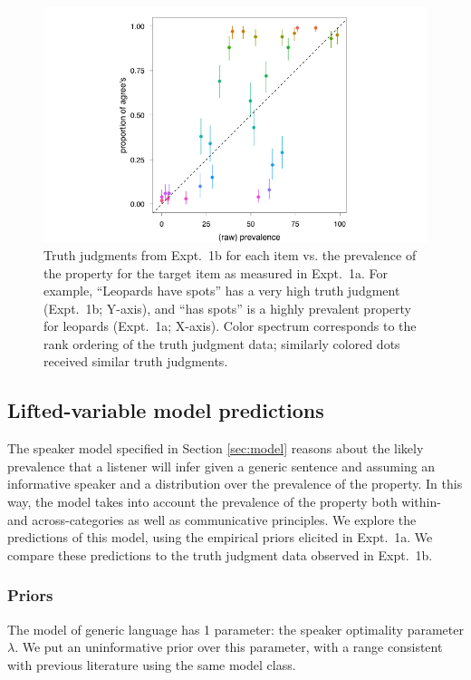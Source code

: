 \documentclass[10pt,letterpaper]{article}
\begin{document}
\begin{figure}
\centering
    \includegraphics[width=0.8\columnwidth]{tj_n50_tjVsPrevalence}
    \caption{Truth judgments from Expt.~1b for each item vs. the prevalence of the property for the target item as measured in Expt.~1a. For example, ``Leopards have spots'' has a very high truth judgment (Expt.~1b; Y-axis), and ``has spots'' is a highly prevalent property for leopards (Expt.~1a; X-axis). Color spectrum corresponds to the rank ordering of the truth judgment data; similarly colored dots received similar truth judgments.}
  \label{fig:scatterprev}
\end{figure}




\subsection{Lifted-variable model predictions}

The speaker model specified in Section \ref{sec:model} reasons about the likely prevalence that a listener will infer given  a generic sentence and assuming an informative speaker and a distribution over the prevalence of the property. 
In this way, the model takes into account the prevalence of the property both within- and across-categories as well as communicative principles.
We explore the predictions of this model, using the empirical priors elicited in Expt.~1a. 
We compare these predictions to the truth judgment data observed in Expt.~1b.
\subsubsection{Priors}

The model of generic language has 1 parameter: the speaker optimality parameter $\lambda$. We put an uninformative prior over this parameter, with a range consistent with previous literature using the same model class.
\end{document}
